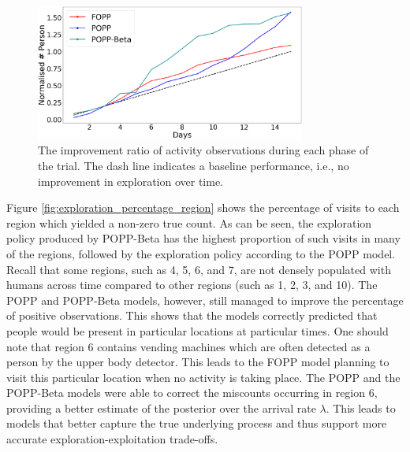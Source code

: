\begin{figure}[t!]
	\centering

	\includegraphics[width=0.79\textwidth]{./figures/exploration_number_people_across_days_normalised.png}
	\caption{The improvement ratio of activity observations during each phase of the trial. The dash line indicates a baseline performance, i.e., no improvement in exploration over time.}
	\label{fig:exploration_improvement_ratio}
\end{figure}

Figure \ref{fig:exploration_percentage_region} shows the percentage of visits to each region which yielded a non-zero true count. As can be seen, the exploration policy produced by POPP-Beta has the highest proportion of such visits in many of the regions, followed by the exploration policy according to the POPP model. Recall that some regions, such as 4, 5, 6, and 7, are not densely populated with humans across time compared to other regions (such as 1, 2, 3, and 10). The POPP and POPP-Beta models, however, still managed to improve the percentage of positive observations. This shows that the models correctly predicted that people would be present in particular locations at particular times. One should note that region 6 contains vending machines which are often detected as a person by the upper body detector. This leads to the FOPP model planning to visit this particular location when no activity is taking place. The POPP and the POPP-Beta models were able to correct the miscounts occurring in region 6, providing a better estimate of the posterior over the arrival rate $\lambda$. This leads to models that better capture the true underlying process and thus support more accurate exploration-exploitation trade-offs.


